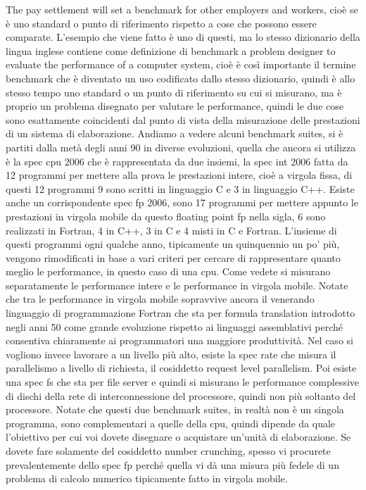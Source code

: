 The pay settlement will set a benchmark for other employers and workers, cioè se è uno standard o punto di riferimento rispetto a cose che possono essere comparate.
L'esempio che viene fatto è uno di questi, ma lo stesso dizionario della lingua inglese contiene come definizione di benchmark a problem designer to evaluate the performance of a computer system, cioè è così importante il termine benchmark che è diventato un uso codificato dallo stesso dizionario, quindi è allo stesso tempo uno standard o un punto di riferimento su cui si misurano, ma è proprio un problema disegnato per valutare le performance, quindi le due cose sono esattamente coincidenti dal punto di vista della misurazione delle prestazioni di un sistema di elaborazione.
Andiamo a vedere alcuni benchmark suites, si è partiti dalla metà degli anni 90 in diverse evoluzioni, quella che ancora si utilizza è la spec cpu 2006 che è rappresentata da due insiemi, la spec int 2006 fatta da 12 programmi per mettere alla prova le prestazioni intere, cioè a virgola fissa, di questi 12 programmi 9 sono scritti in linguaggio C e 3 in linguaggio C++.
Esiste anche un corrispondente spec fp 2006, sono 17 programmi per mettere appunto le prestazioni in virgola mobile da questo floating point fp nella sigla, 6 sono realizzati in Fortran, 4 in C++, 3 in C e 4 misti in C e Fortran.
L'insieme di questi programmi ogni qualche anno, tipicamente un quinquennio un po' più, vengono rimodificati in base a vari criteri per cercare di rappresentare quanto meglio le performance, in questo caso di una cpu.
Come vedete si misurano separatamente le performance intere e le performance in virgola mobile.
Notate che tra le performance in virgola mobile sopravvive ancora il venerando linguaggio di programmazione Fortran che sta per formula translation introdotto negli anni 50 come grande evoluzione rispetto ai linguaggi assemblativi perché consentiva chiaramente ai programmatori una maggiore produttività.
Nel caso si vogliono invece lavorare a un livello più alto, esiste la spec rate che misura il parallelismo a livello di richiesta, il cosiddetto request level parallelism.
Poi esiste una spec fs che sta per file server e quindi si misurano le performance complessive di dischi della rete di interconnessione del processore, quindi non più soltanto del processore.
Notate che questi due benchmark suites, in realtà non è un singola programma, sono complementari a quelle della cpu, quindi dipende da quale l'obiettivo per cui voi dovete disegnare o acquistare un'unità di elaborazione.
Se dovete fare solamente del cosiddetto number crunching, spesso vi procurete prevalentemente dello spec fp perché quella vi dà una misura più fedele di un problema di calcolo numerico tipicamente fatto in virgola mobile.
